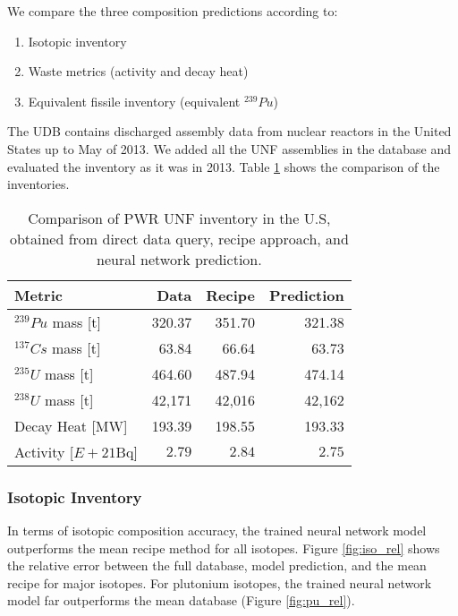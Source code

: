 We compare the three composition predictions according to:
\begin{enumerate}
    \item Isotopic inventory
    \item Waste metrics (activity and decay heat)
    \item Equivalent fissile inventory (equivalent $^{239}Pu$)
\end{enumerate}

The \gls{UDB} contains discharged assembly data
from nuclear reactors in the United States up to May of
2013. We added all the \gls{UNF} assemblies in the database
and evaluated the inventory as it was in 2013. 
Table \ref{tab:met} shows the comparison of the inventories.

\begin{table}[h]
    \centering
    \begin{tabular}{l|r|rr}
        \hline
        Metric & Data & Recipe & Prediction \\
        \hline
        $^{239}Pu$ mass [t] & 320.37 & 351.70 & 321.38\\
        $^{137}Cs$ mass [t] & 63.84 & 66.64 & 63.73 \\
        $^{235}U$ mass [t] & 464.60 & 487.94 & 474.14\\
        $^{238}U$ mass [t] & 42,171 & 42,016 & 42,162\\
        \hline
        Decay Heat [MW] & 193.39 & 198.55 & 193.33 \\
        Activity [$E+21$Bq] & $2.79$ & $2.84$ & $2.75$ \\
        \hline
    \end{tabular}
    \caption{Comparison of \gls{PWR} \gls{UNF} inventory in the U.S,
             obtained from direct data query, recipe approach,
             and neural network prediction. 
    \label{tab:met}}
\end{table}

\FloatBarrier

\subsubsection{Isotopic Inventory}

In terms of isotopic composition accuracy, the trained
neural network model outperforms the
mean recipe method for all isotopes.
Figure \ref{fig:iso_rel} shows the relative
error between the full database, model prediction, and
the mean recipe for
major isotopes. For plutonium isotopes, the trained neural
network model far
outperforms the mean database (Figure \ref{fig:pu_rel}).

